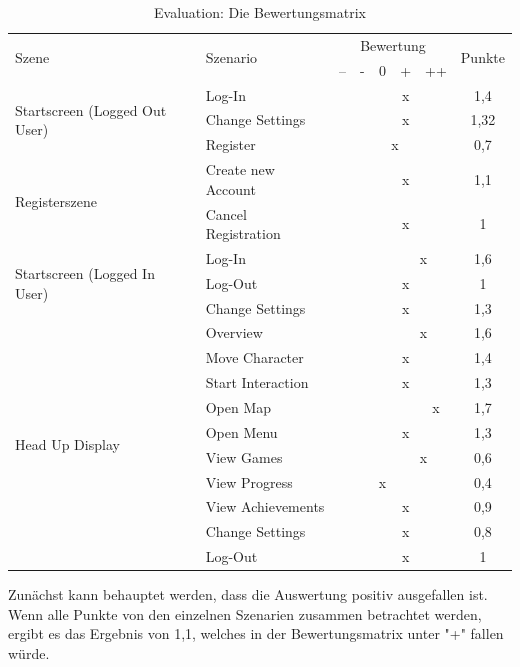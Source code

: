 \begin{table}[htbp]
	\centering
	\begin{tabular}{|l|l|c|c|c|c|c|c|}
		\hline
		\multirow{2}{*}{Szene} & \multirow{2}{*}{Szenario} &\multicolumn{5}{c}{Bewertung} \vline & \multirow{2}{*}{Punkte} \\ 
		& & -- & - & 0 & + & ++ & \\ \hline
		\multirow{3}{*}{Startscreen (Logged Out User)} & Log-In &  &  &  & x &  & 1,4 \\ 
		& Change Settings &  &  &  & x &  & 1,32 \\ 
		& Register &  &  &\multicolumn{2}{c}{x} \vline &  & 0,7 \\ \hline 
		\multirow{2}{*}{Registerszene} & Create new Account &  &  &  & x &  & 1,1 \\ 
		& Cancel Registration &  &  &  & x &  & 1 \\ \hline 
		\multirow{3}{*}{Startscreen (Logged In User)} & Log-In &  &  &  &\multicolumn{2}{c}{x} \vline & 1,6 \\ 
		& Log-Out &  &  &  & x &  & 1 \\ 
		& Change Settings &  &  &  & x &  & 1,3 \\ \hline 
		\multirow{10}{*}{Head Up Display} & Overview &  &  &  &\multicolumn{2}{c}{x} \vline & 1,6 \\  
		& Move Character &  &  &  & x &  & 1,4 \\  
		& Start Interaction &  &  &  & x &  & 1,3 \\  
		& Open Map &  &  &  &  & x & 1,7 \\  
		& Open Menu &  &  &  & x &  & 1,3 \\  
		& View Games &  &  &  &\multicolumn{2}{c}{x} \vline & 0,6 \\  
		& View Progress &  &  & x &  &  & 0,4 \\
		& View Achievements &  &  &  & x &  & 0,9 \\ 
		& Change Settings &  &  &  & x &  & 0,8 \\ 
		& Log-Out &  &  &  & x &  & 1 \\ 
		\hline
	\end{tabular}
	\caption{Evaluation: Die Bewertungsmatrix}
	\label{tab:ergbnisOverall}
\end{table}

				Zunächst kann behauptet werden, dass die Auswertung positiv ausgefallen ist. Wenn alle Punkte von den einzelnen Szenarien zusammen betrachtet werden, ergibt es das Ergebnis von 1,1, welches in der Bewertungsmatrix unter "+" fallen würde.

